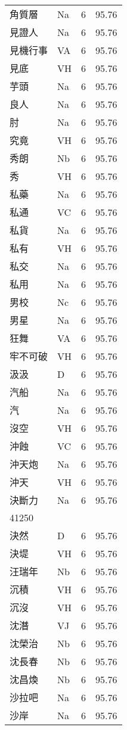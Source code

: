 \documentclass[twocolumn]{book}
\begin{document}
\begin{supertabular}{llrr}
角質層 & Na & 6 &  95.76\\
見證人 & Na & 6 &  95.76\\
見機行事 & VA & 6 &  95.76\\
見底 & VH & 6 &  95.76\\
芋頭 & Na & 6 &  95.76\\
良人 & Na & 6 &  95.76\\
肘 & Na & 6 &  95.76\\
究竟 & VH & 6 &  95.76\\
秀朗 & Nb & 6 &  95.76\\
秀 & VH & 6 &  95.76\\
私藥 & Na & 6 &  95.76\\
私通 & VC & 6 &  95.76\\
私貨 & Na & 6 &  95.76\\
私有 & VH & 6 &  95.76\\
私交 & Na & 6 &  95.76\\
私用 & Na & 6 &  95.76\\
男校 & Nc & 6 &  95.76\\
男星 & Na & 6 &  95.76\\
狂舞 & VA & 6 &  95.76\\
牢不可破 & VH & 6 &  95.76\\
汲汲 & D & 6 &  95.76\\
汽船 & Na & 6 &  95.76\\
汽 & Na & 6 &  95.76\\
沒空 & VH & 6 &  95.76\\
沖蝕 & VC & 6 &  95.76\\
沖天炮 & Na & 6 &  95.76\\
沖天 & VH & 6 &  95.76\\
決斷力 & Na & 6 &  95.76\\
41250\\
決然 & D & 6 &  95.76\\
決堤 & VH & 6 &  95.76\\
汪瑞年 & Nb & 6 &  95.76\\
沉積 & VH & 6 &  95.76\\
沉沒 & VH & 6 &  95.76\\
沈潛 & VJ & 6 &  95.76\\
沈榮治 & Nb & 6 &  95.76\\
沈長春 & Nb & 6 &  95.76\\
沈昌煥 & Nb & 6 &  95.76\\
沙拉吧 & Na & 6 &  95.76\\
沙岸 & Na & 6 &  95.76\\

\end{supertabular}
\end{document}

